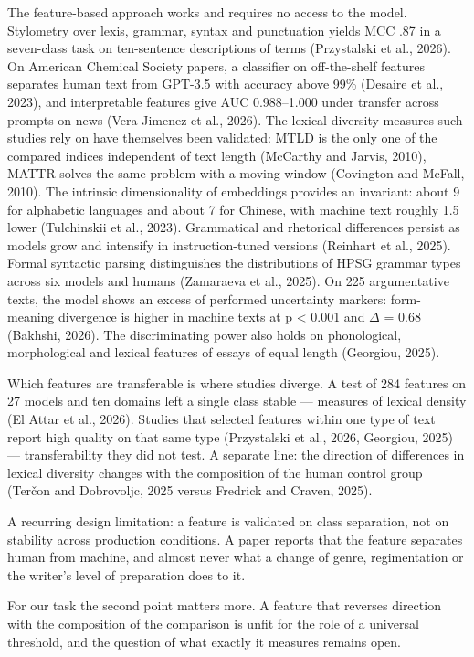 \documentclass[11pt,a4paper]{article}
\renewcommand{\_}{\textunderscore\allowbreak}
\begin{document}
The feature-based approach works and requires no access to the model. Stylometry
over lexis, grammar, syntax and punctuation yields MCC .87 in a seven-class task
on ten-sentence descriptions of terms (Przystalski et al., 2026). On
American Chemical Society papers, a classifier on off-the-shelf features separates
human text from GPT-3.5 with accuracy above 99\% (Desaire et al., 2023), and interpretable
features give AUC 0.988–1.000 under transfer across prompts on news (Vera-Jimenez et al., 2026).
The lexical diversity measures such studies rely on have themselves been
validated: MTLD is the only one of the compared indices independent of text
length (McCarthy and Jarvis, 2010), MATTR solves the same problem with a moving window (Covington and McFall, 2010). The intrinsic
dimensionality of embeddings provides an invariant: about 9 for alphabetic
languages and about 7 for Chinese, with machine text roughly 1.5 lower (Tulchinskii et al., 2023). Grammatical and
rhetorical differences persist as models grow and intensify in
instruction-tuned versions (Reinhart et al., 2025). Formal syntactic parsing distinguishes the
distributions of HPSG grammar types across six models and humans (Zamaraeva et al., 2025). On 225
argumentative texts, the model shows an excess of performed uncertainty
markers: form-meaning divergence is higher in machine texts at p < 0.001 and
$\Delta$ = 0.68 (Bakhshi, 2026). The discriminating power also holds on phonological,
morphological and lexical features of essays of equal length (Georgiou, 2025).

Which features are transferable is where studies diverge. A test of 284 features on 27
models and ten domains left a single class stable — measures of lexical
density (El Attar et al., 2026). Studies that selected features within one type of
text report high quality on that same type (Przystalski et al., 2026, Georgiou, 2025) — transferability they did not
test. A separate line: the direction of differences in lexical diversity
changes with the composition of the human control group (Ter\v{c}on and Dobrovoljc, 2025 versus Fredrick and Craven, 2025).

A recurring design limitation: a feature is validated on class separation, not
on stability across production conditions. A paper reports that the feature
separates human from machine, and almost never what a change of genre,
regimentation or the writer's level of preparation does to it.

For our task the second point matters more. A feature that reverses direction
with the composition of the comparison is unfit for the role of a universal
threshold, and the question of what exactly it measures remains open.
\end{document}
